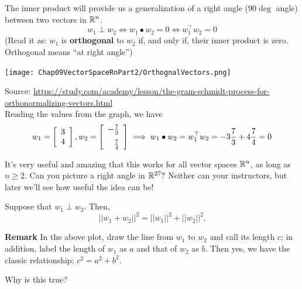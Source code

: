\vspace*{0.2cm}
\begin{tcolorbox}[sharp corners, colback=green!30, colframe=green!80!blue, title=\textbf{\Large Key Use of the Dot (aka Inner) Product of Two Vectors}]

The inner product will provide us a generalization of a right angle ($90\deg$ angle) between two vectors in $\mathbb R^n$. $$w_1 \perp w_2 \iff w_1 \bullet w_2 =0 \iff w_1^\top w_2 =0$$
(Read it as: $w_1$ is \textbf{orthogonal} to $w_2$ if, and only if, their inner product is zero. Orthogonal means ``at right angle'')
\vspace*{.3cm}
\begin{center}
  \texttt{[image: Chap09VectorSpaceRnPart2/OrthognalVectors.png]}  
\end{center}
Source: {\smaller \url{https://study.com/academy/lesson/the-gram-schmidt-process-for-orthonormalizing-vectors.html}}\\

Reading the values from the graph, we have 
$$ w_1=  \left[ \begin{array}{r}3 \\ 4  \end{array} \right],  w_2=  \left[ \begin{array}{r} -\frac{7}{3} \medskip \\   \frac{7}{4} \end{array} \right] \implies w_1 \bullet w_2 = w_1^\top w_2 = -3\frac{7}{3} + 4 \frac{7}{4} = 0 $$

It's very useful and amazing that this works for all vector spaces $\mathbb R^n$, as long as  $n\ge2$. Can you picture a right angle in $\mathbb R^{27}?$ Neither can your instructors, but later we'll see how useful the idea can be!
\end{tcolorbox}
\vspace*{.2cm}

\begin{tcolorbox}[title=\textbf{Pythagorean Theorem in $\boldsymbol{\real^n, n\ge2}$.}]
 Suppose that $w_1 \perp w_2$. Then,
$$||w_1 + w_2||^2 = ||w_1||^2 + ||w_2||^2. $$

\textbf{Remark} In the above plot, draw the line from $w_1$ to $w_2$ and call its length $c$; in addition, label the length of $w_1$ as $a$ and that of $w_2$ as $b$. Then yes, we have the classic relationship: $c^2 = a^2 + b^2$.
\end{tcolorbox}

\begin{example}
\label{ex:Pthagorean}
Why is this true? 
\end{example}

